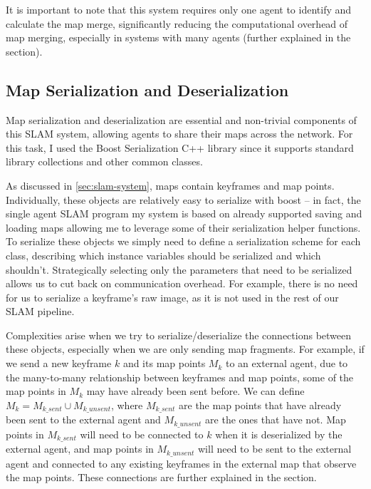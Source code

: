 \begin{enumerate}
\end{enumerate}

It is important to note that this system requires only one agent to identify and calculate the map merge, significantly reducing the computational overhead of map merging, especially in systems with many agents (further explained in the  section).


\subsection{Map Serialization and Deserialization}
\label{sec:map-serialization-and-deserialization}
Map serialization and deserialization are essential and non-trivial components of this SLAM system, allowing agents to share their maps across the network. For this task, I used the Boost \autocite{boostLibrary} Serialization C++ library since it supports standard library collections and other common classes.

As discussed in \autoref{sec:slam-system}, maps contain keyframes and map points. Individually, these objects are relatively easy to serialize with boost – in fact, the single agent SLAM program my system is based on already supported saving and loading maps allowing me to leverage some of their serialization helper functions. To serialize these objects we simply need to define a serialization scheme for each class, describing which instance variables should be serialized and which shouldn't. Strategically selecting only the parameters that need to be serialized allows us to cut back on communication overhead. For example, there is no need for us to serialize a keyframe's raw image, as it is not used in the rest of our SLAM pipeline.

Complexities arise when we try to serialize/deserialize the connections between these objects, especially when we are only sending map fragments. For example, if we send a new keyframe $k$ and its map points $M_k$ to an external agent, due to the many-to-many relationship between keyframes and map points, some of the map points in $M_k$ may have already been sent before. We can define $M_k = M_{k\_sent} \cup M_{k\_unsent}$, where $M_{k\_sent}$ are the map points that have already been sent to the external agent and $M_{k\_unsent}$ are the ones that have not. Map points in $M_{k\_sent}$ will need to be connected to $k$ when it is deserialized by the external agent, and map points in $M_{k\_unsent}$ will need to be sent to the external agent and connected to any existing keyframes in the external map that observe the map points. These connections are further explained in the  section.

